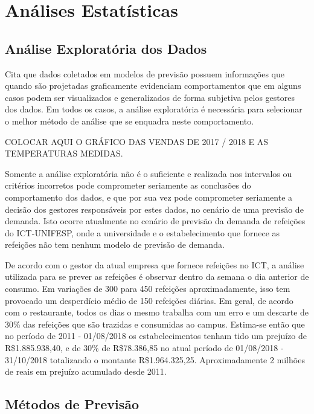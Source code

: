 \documentclass[	12pt, Times, openright, twoside, a4paper, english, brazil]{abntex2}
\begin{document}
      \section{Análises Estatísticas}
        \subsection{Análise Exploratória dos Dados}
          \cite{Junior2007} Cita que dados coletados em modelos de previsão possuem informações que quando são projetadas graficamente evidenciam comportamentos que em alguns casos podem ser visualizados e generalizados de forma subjetiva pelos gestores dos dados.  
          Em todos os casos, a análise exploratória é necessária para selecionar o melhor método de análise que se enquadra neste comportamento.

          COLOCAR AQUI O GRÁFICO DAS VENDAS DE 2017 / 2018 E AS TEMPERATURAS MEDIDAS.

          Somente a análise exploratória não é o suficiente e realizada nos intervalos ou critérios incorretos pode comprometer seriamente as conclusões do comportamento dos dados, e que por sua vez pode comprometer seriamente a decisão dos gestores responsáveis por estes dados, no cenário de uma previsão de demanda. 
          Isto ocorre atualmente no cenário de previsão da demanda de refeições do ICT-UNIFESP, onde a universidade e o estabelecimento que fornece as refeições não tem nenhum modelo de previsão de demanda. 

          De acordo com o gestor da atual empresa que fornece refeições no ICT, a análise utilizada para se prever as refeições é observar dentro da semana o dia anterior de consumo. Em variações de 300 para 450 refeições aproximadamente, isso tem provocado um desperdício médio de 150 refeições diárias. Em geral, de acordo com o restaurante, todos os dias o mesmo trabalha com um erro e um descarte de 30\% das refeições que são trazidas e consumidas ao campus. Estima-se então que no período de 2011 - 01/08/2018 os estabelecimentos tenham tido um prejuízo de R\$1.885.938,40, e de 30\% de R\$78.386,85 no atual período de 01/08/2018 - 31/10/2018 totalizando o montante  R\$1.964.325,25. Aproximadamente 2 milhões de reais em prejuízo acumulado desde 2011.

        \subsection{Métodos de Previsão} 
\end{document}
